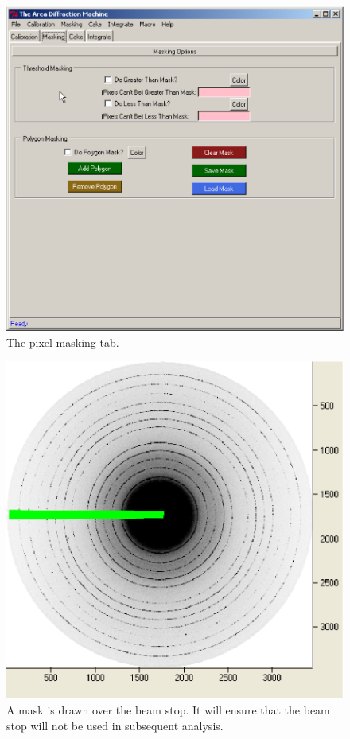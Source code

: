 \begin{figure}
    \centering
    \includegraphics[scale=.75]
    {figures/masking_tab.eps}
    \caption{The pixel masking tab.}
    \label{masking_tab_example}
\end{figure}

\begin{figure}
    \centering
    \includegraphics[scale=.75]
    {figures/masked_beam_stop.eps}
    \caption{A mask is drawn over the beam stop. It will ensure
    that the beam stop will not be used in subsequent analysis.}
    \label{masked_beam_stop}
\end{figure}


